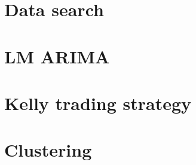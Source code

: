 \documentclass{article}
\begin{document}
	\section{Data search}
	
	\section{LM ARIMA}
	
	\section{Kelly trading strategy}
	
	\section{Clustering}
\end{document}

